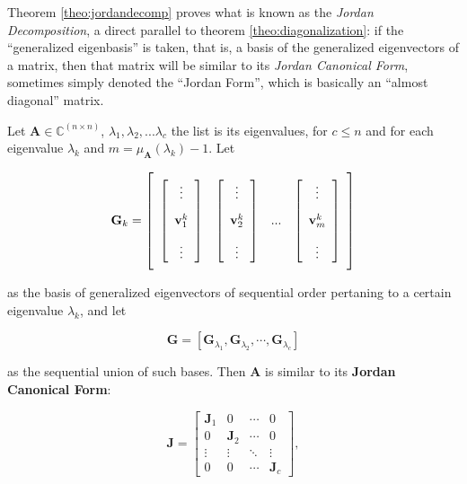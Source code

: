 	Theorem \ref{theo:jordandecomp} proves what is known as the \textit{Jordan Decomposition}, a direct parallel to theorem \ref{theo:diagonalization}: if the ``generalized eigenbasis'' is taken, that is, a basis of the generalized eigenvectors of a matrix, then that matrix will be similar to its \textit{Jordan Canonical Form}, sometimes simply denoted the ``Jordan Form'', which is basically an ``almost diagonal'' matrix.

\begin{theorem}\label{theo:jordandecomp} %
	Let $\mathbf{A}\in\mathbb{C}^{(n\times n)}$, $\lambda_1,\lambda_2,...\lambda_c$ the list is its eigenvalues, for $c\leq n$ and for each eigenvalue $\lambda_k$ and $m = \mu_\mathbf{A}\left(\lambda_k\right) - 1$. Let

\begin{equation} \mathbf{G}_k = \left[\raisebox{15mm}{} \begin{array}{cccc} \left[\begin{array}{c} \vdots \\[3mm] \mathbf{v}_1^k \\[3mm] \vdots \end{array}\right] & \left[\begin{array}{c} \vdots \\[3mm] \mathbf{v}_2^k \\[3mm] \vdots \end{array}\right] & ... & \left[\begin{array}{c} \vdots \\[3mm] \mathbf{v}_{m}^k \\[3mm] \vdots \end{array}\right]\end{array}\right] \label{eq:jordandecomp}\end{equation}

	\noindent as the basis of generalized eigenvectors of sequential order pertaning to a certain eigenvalue $\lambda_k$, and let 

\begin{equation} \mathbf{G} = \left[ \mathbf{G}_{\lambda_1},\mathbf{G}_{\lambda_2},\cdots,\mathbf{G}_{\lambda_c}\right]\end{equation}
	
	\noindent as the sequential union of such bases. Then $\mathbf{A}$ is similar to its \textbf{Jordan Canonical Form}:

\begin{equation} \mathbf{J} = \left[\begin{array}{cccc} \mathbf{J}_1 & 0 & \cdots & 0 \\[3mm] 0 & \mathbf{J}_2 & \cdots & 0 \\[3mm] \vdots & \vdots & \ddots & \vdots \\[3mm] 0 & 0 & \cdots & \mathbf{J}_c \end{array}\right], \end{equation}


\end{theorem}
